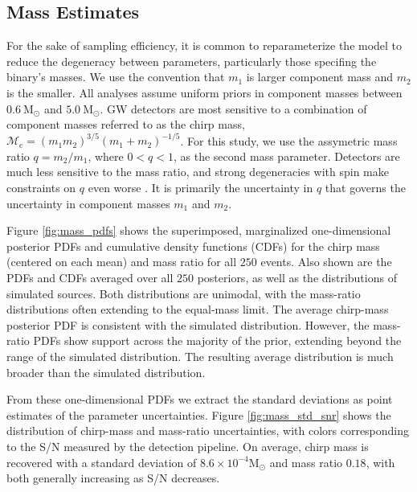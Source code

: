 \subsection{Mass Estimates}

For the sake of sampling efficiency, it is common to reparameterize the model to reduce the degeneracy between parameters, particularly those specifing the binary's masses.  We use the convention that $m_1$ is larger component mass and $m_2$ is the smaller.  All analyses assume uniform priors in component masses between $0.6~\mathrm{M}_\odot$ and $5.0~\mathrm{M}_\odot$.  GW detectors are most sensitive to a combination of component masses referred to as the chirp mass, $\mathcal{M}_\mathrm{c} = (m_1 m_2)^{3/5} (m_1 + m_2)^{-1/5}$.  For this study, we use the assymetric mass ratio $q = m_2/m_1$, where $0 < q < 1$, as the second mass parameter.  Detectors are much less sensitive to the mass ratio, and strong degeneracies with spin make constraints on $q$ even worse \citep{Cutler_1994}.  It is primarily the uncertainty in $q$ that governs the uncertainty in component masses $m_1$ and $m_2$.

Figure \ref{fig:mass_pdfs} shows the superimposed, marginalized one-dimensional posterior PDFs and cumulative density functions (CDFs) for the chirp mass (centered on each mean) and mass ratio for all $250$ events.  Also shown are the PDFs and CDFs averaged over all $250$ posteriors, as well as the distributions of simulated sources.  Both distributions are unimodal, with the mass-ratio distributions often extending to the equal-mass limit.  The average chirp-mass posterior PDF is consistent with the simulated distribution.  However, the mass-ratio PDFs show support across the majority of the prior, extending beyond the range of the simulated distribution.  The resulting average distribution is much broader than the simulated distribution.

From these one-dimensional PDFs we extract the standard deviations as point estimates of the parameter uncertainties.  Figure \ref{fig:mass_std_snr} shows the distribution of chirp-mass and mass-ratio uncertainties, with colors corresponding to the S/N measured by the detection pipeline. On average, chirp mass is recovered with a standard deviation of $8.6 \times 10^{-4} \mathrm{M}_\odot$ and mass ratio $0.18$, with both generally increasing as S/N decreases.